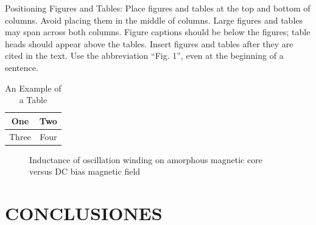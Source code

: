 \documentclass[a4paper, 10pt, journal]{ieeeconf}
\begin{document}
Positioning Figures and Tables: Place figures and tables at the top and bottom of columns. Avoid placing them in the middle of columns. Large figures and tables may span across both columns. Figure captions should be below the figures; table heads should appear above the tables. Insert figures and tables after they are cited in the text. Use the abbreviation ``Fig. 1'', even at the beginning of a sentence.

\begin{table}[h]
\caption{An Example of a Table}
\label{table_example}
\begin{center}
\begin{tabular}{|c||c|}
\hline
One & Two\\
\hline
Three & Four\\
\hline
\end{tabular}
\end{center}
\end{table}


   \begin{figure}[thpb]
      \centering
      \caption{Inductance of oscillation winding on amorphous
       magnetic core versus DC bias magnetic field}
      \label{figurelabel}
   \end{figure}

\section{CONCLUSIONES}


\addtolength{\textheight}{-12cm}   %




\end{document}
